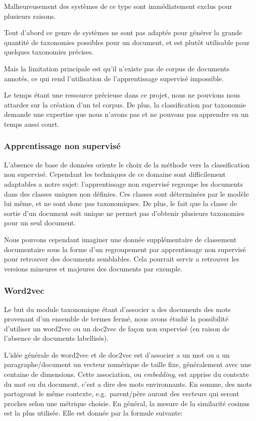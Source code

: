 Malheureusement des systèmes de ce type sont immédiatement exclus pour plusieurs raisons.

Tout d'abord ce genre de systèmes ne sont pas adaptés pour générer la grande quantité de taxonomies possibles pour un document, et est plutôt utilisable pour quelques taxonomies précises.

Mais la limitation principale est qu'il n'existe pas de corpus de documents annotés, ce qui rend l'utilisation de l'apprentissage supervisé impossible.

Le temps étant une ressource précieuse dans ce projet, nous ne pouvions nous attarder sur la création d'un tel corpus.
De plus, la classification par taxonomie demande une expertise que nous n'avons pas et ne pouvons pas apprendre en un temps aussi court.

\subsubsection{Apprentissage non supervisé}
L'absence de base de données oriente le choix de la méthode vers la classification non supervisé.
Cependant les techniques de ce domaine sont difficilement adaptables a notre sujet: l'apprentissage non supervisé regroupe les documents dans des classes uniques non définies.
Ces classes sont déterminées par le modèle lui même, et ne sont donc pas taxonomiques.
De plus, le fait que la classe de sortie d'un document soit unique ne permet pas d'obtenir plusieurs taxonomies pour un seul document.

Nous pouvons cependant imaginer une donnée supplémentaire de classement documentaire sous la forme d'un regroupement par apprentissage non supervisé pour retrouver des documents semblables.
Cela pourrait servir a retrouver les versions mineures et majeures des documents par exemple.


\subsubsection{Word2vec}
Le but du module taxonomique étant d'associer a des documents des mots provenant d'un ensemble de termes fermé, nous avons étudié la possibilité d'utiliser un word2vec\cite{word2vec} ou un doc2vec de façon non supervisé (en raison de l'absence de documents labellisés).

L'idée générale de word2vec et de doc2vec est d'associer a un mot ou a un paragraphe/document un vecteur numérique de taille fixe, généralement avec une centaine de dimensions.
Cette association, ou \textit{embedding}, est apprise du contexte du mot ou du document, c'est a dire des mots environnants.
En somme, des mots partageant le même contexte, e.g.\ parent/père auront des vecteurs qui seront proches selon une métrique choisie.
En général, la mesure de la similarité cosinus est la plus utilisée.
Elle est donnée par la formule suivante:

